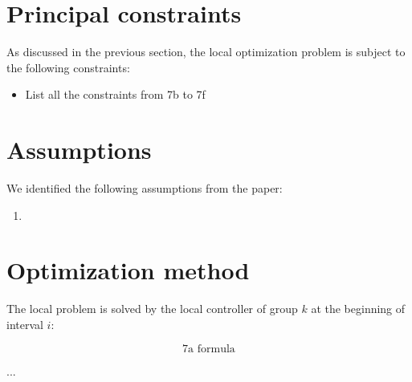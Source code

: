 \documentclass[12pt,a4paper,oneside]{book}
\begin{document}
\section{Principal constraints}
As discussed in the previous section, the local optimization problem is subject to the 
following constraints:
\begin{itemize}
    \renewcommand{\labelitemi}{-}
    \item List all the constraints from 7b to 7f
\end{itemize}

\section{Assumptions}
We identified the following assumptions from the paper:  
\begin{enumerate}
    \item 
\end{enumerate}

\section{Optimization method}
The local problem is solved by the local controller of group $k$ at the beginning of interval 
$i$: 

$$\text{7a formula}$$

...
\end{document}
